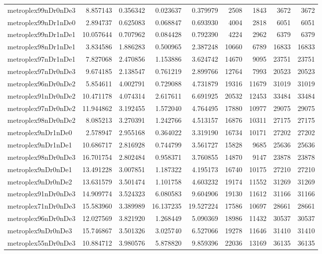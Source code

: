 \begin{longtable}{|l|r|r|r|r|r|r|r|r|}
metroplex99nDr0nDe3 & 8.857143 & 0.356342 & 0.023637 & 0.379979 & 2508 & 1843 & 3672 & 3672 \\
metroplex99nDr1nDe0 & 2.894737 & 0.625083 & 0.068847 & 0.693930 & 4004 & 2818 & 6051 & 6051 \\
metroplex99nDr1nDe1 & 10.057644 & 0.707962 & 0.084428 & 0.792390 & 4224 & 2962 & 6379 & 6379 \\
metroplex98nDr1nDe1 & 3.834586 & 1.886283 & 0.500965 & 2.387248 & 10660 & 6789 & 16833 & 16833 \\
metroplex97nDr1nDe1 & 7.827068 & 2.470856 & 1.153886 & 3.624742 & 14670 & 9095 & 23751 & 23751 \\
metroplex97nDr0nDe3 & 9.674185 & 2.138547 & 0.761219 & 2.899766 & 12764 & 7993 & 20523 & 20523 \\
metroplex96nDr0nDe2 & 5.854611 & 4.002791 & 0.729088 & 4.731879 & 19316 & 11679 & 31019 & 31019 \\
metroplex91nDr0nDe2 & 10.471178 & 4.074314 & 2.617611 & 6.691925 & 20532 & 12453 & 33484 & 33484 \\
metroplex97nDr0nDe2 & 11.944862 & 3.192455 & 1.572040 & 4.764495 & 17880 & 10977 & 29075 & 29075 \\
metroplex98nDr0nDe2 & 8.085213 & 3.270391 & 1.242766 & 4.513157 & 16876 & 10311 & 27175 & 27175 \\
metroplex9nDr1nDe0 & 2.578947 & 2.955168 & 0.364022 & 3.319190 & 16734 & 10171 & 27202 & 27202 \\
metroplex9nDr1nDe1 & 10.686717 & 2.816928 & 0.744799 & 3.561727 & 15828 & 9685 & 25636 & 25636 \\
metroplex98nDr0nDe3 & 16.701754 & 2.802484 & 0.958371 & 3.760855 & 14870 & 9147 & 23878 & 23878 \\
metroplex9nDr0nDe1 & 13.491228 & 3.007851 & 1.187322 & 4.195173 & 16740 & 10175 & 27210 & 27210 \\
metroplex9nDr0nDe2 & 13.631579 & 3.501474 & 1.101758 & 4.603232 & 19174 & 11552 & 31269 & 31269 \\
metroplex91nDr0nDe3 & 14.909774 & 3.524323 & 6.080583 & 9.604906 & 19130 & 11612 & 31166 & 31166 \\
metroplex71nDr0nDe3 & 15.583960 & 3.389989 & 16.137235 & 19.527224 & 17586 & 10697 & 28661 & 28661 \\
metroplex96nDr0nDe3 & 12.027569 & 3.821920 & 1.268449 & 5.090369 & 18986 & 11432 & 30537 & 30537 \\
metroplex9nDr0nDe3 & 15.746867 & 3.501326 & 3.025740 & 6.527066 & 19278 & 11646 & 31410 & 31410 \\
metroplex55nDr0nDe3 & 10.884712 & 3.980576 & 5.878820 & 9.859396 & 22036 & 13169 & 36135 & 36135 \\
\end{longtable}
